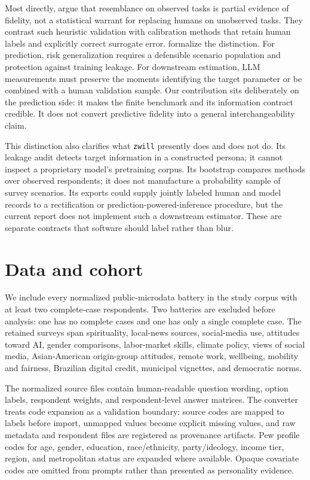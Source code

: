 \documentclass[11pt]{article}
\newcommand{\zwill}{\texttt{zwill}}
\begin{document}
Most directly, \citet{hullman2026human} argue that resemblance on observed
tasks is partial evidence of fidelity, not a statistical warrant for replacing
humans on unobserved tasks. They contrast such heuristic validation with
calibration methods that retain human labels and explicitly correct surrogate
error. \citet{ludwig2025llm} formalize the distinction. For prediction, risk
generalization requires a defensible scenario population and protection
against training leakage. For downstream estimation, LLM measurements must
preserve the moments identifying the target parameter or be combined with a
human validation sample. Our contribution sits deliberately on the prediction
side: it makes the finite benchmark and its information contract credible. It
does not convert predictive fidelity into a general interchangeability claim.

This distinction also clarifies what \zwill{} presently does and does not do.
Its leakage audit detects target information in a constructed persona; it
cannot inspect a proprietary model's pretraining corpus. Its bootstrap compares
methods over observed respondents; it does not manufacture a probability
sample of survey scenarios. Its exports could supply jointly labeled human and
model records to a rectification or prediction-powered-inference procedure,
but the current report does not implement such a downstream estimator. These
are separate contracts that software should label rather than blur.

\section{Data and cohort}
We include every normalized public-microdata battery in the study corpus with
at least two complete-case respondents.
Two batteries are excluded before analysis: one has no complete cases and one
has only a single complete case. The retained surveys span spirituality,
local-news sources, social-media use, attitudes toward AI, gender comparisons,
labor-market skills, climate policy, views of social media, Asian-American
origin-group attitudes, remote work, wellbeing, mobility and fairness,
Brazilian digital credit, municipal vignettes, and democratic norms.

The normalized source files contain human-readable question wording, option
labels, respondent weights, and respondent-level answer matrices. The
converter treats code expansion as a validation boundary: source codes are
mapped to labels before import, unmapped values become explicit missing values,
and raw metadata and respondent files are registered as provenance artifacts.
Pew profile codes for age, gender, education, race/ethnicity, party/ideology,
income tier, region, and metropolitan status are expanded where available.
Opaque covariate codes are omitted from prompts rather than presented as
personality evidence.
\end{document}
